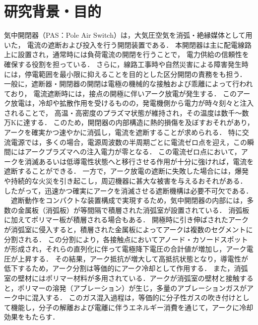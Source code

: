 \documentclass[dvipdfmx,report,uplatex]{jsbook}
\numberwithin{equation}{section}
\numberwithin{figure}{section}
\numberwithin{table}{section}
\begin{document}
\section{研究背景・目的}
気中開閉器（PAS：Pole Air Switch）は，大気圧空気を消弧・絶縁媒体として用いた，
電流の遮断および投入を行う開閉装置である．
本開閉器は主に配電線路上に設置され，通常時には負荷電流の開閉を行うことで，
電力供給の信頼性を確保する役割を担っている\cite{kyuden_tandd}\cite{小田切司朗2009配電自動化の変遷}\cite{石谷卓也2012センサ付開閉器の負荷情報を活用した配電系統のオンライン構成変更}．
さらに，線路工事時や自然災害による障害発生時には，停電範囲を最小限に抑えることを目的とした区分開閉の責務をも担う．
一般に，遮断器・開閉器の開閉は電極の機械的な接触および乖離によって行われており，
電流遮断時には，接点の開極に伴いアーク放電が発生する．
このアーク放電は，冷却や拡散作用を受けるものの，発電機側から電力が時々刻々と注入されることで，
高温・高密度のプラズマ状態が維持され，その温度は数千〜数万Kに達する．
このため，開閉器の内部構造に熱的損傷を及ぼすおそれがあり，アークを確実かつ速やかに消弧し，電流を遮断することが求められる．
特に交流電源では，多くの場合，電源周波数の半周期ごとに電流ゼロ点を迎え，この瞬間にはアークプラズマへの注入電力が零となる．
この電流ゼロ点において，アークを消滅あるいは低導電性状態へと移行させる作用が十分に強ければ，電流を遮断することができる\cite{渋谷正豊1987第}．
一方で，アーク放電の遮断に失敗した場合には，爆発や持続的な火災を引き起こし，周辺機器に甚大な被害を与えるおそれがある．\cite{nowlen2008high}
したがって，迅速かつ確実にアークを消滅させる遮断機構は必要不可欠である．\\
　遮断動作をコンパクトな装置構成で実現するため，気中開閉器の内部には，多数の金属板（消弧板）が等間隔で積層された消弧室が設置されている\cite{freton2009overview}．
消弧板に加えてポリマー板が積層される場合もある．
開極時に引き伸ばされたアークが消弧室に侵入すると，積層された金属板によってアークは複数のセグメントに分割される\cite{mcbride2001review}．
この分割により，各接触点においてアノード・カソードスポットが形成され，それらの直列化に伴って電極降下電圧の合計値が増加し，アーク電圧が上昇する．
その結果，アーク抵抗が増大して高抵抗状態となり，導電性が低下するため，アーク分割は等価的にアーク冷却として作用する．
また，消弧室の壁材にはポリマー材料が多用されている．アークが消弧室の壁材と接触すると，ポリマーの溶発（アブレーション）が生じ，多量のアブレーションガスがアーク中に混入する\cite{freton2009overview}．
このガス混入過程は，等価的に分子性ガスの吹き付けとして機能し，分子の解離および電離に伴うエネルギー消費を通じて，アークに冷却効果をもたらす\cite{onchi2012effect,nakagawa2015numerical}．
\end{document}
